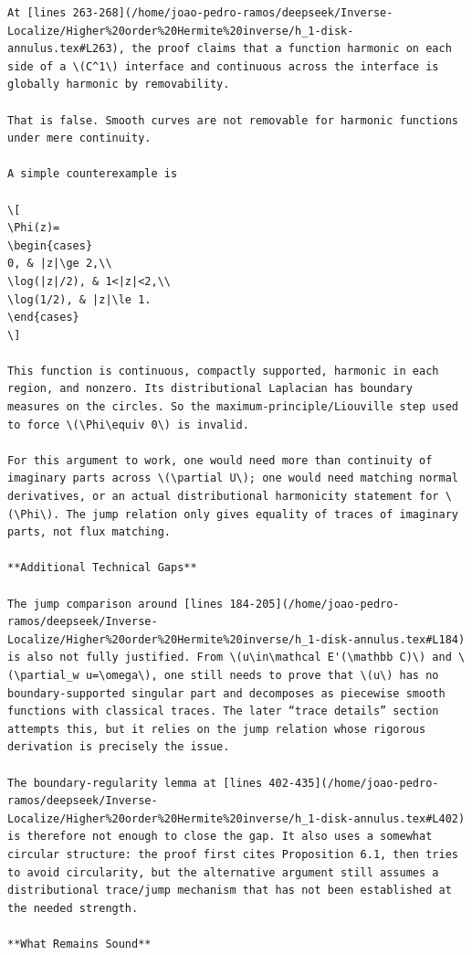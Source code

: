 \documentclass[11pt]{article}
\newcommand{\1}{\mathbf 1}
\begin{document}
\begin{verbatim}
At [lines 263-268](/home/joao-pedro-ramos/deepseek/Inverse-Localize/Higher%20order%20Hermite%20inverse/h_1-disk-annulus.tex#L263), the proof claims that a function harmonic on each side of a \(C^1\) interface and continuous across the interface is globally harmonic by removability.

That is false. Smooth curves are not removable for harmonic functions under mere continuity.

A simple counterexample is

\[
\Phi(z)=
\begin{cases}
0, & |z|\ge 2,\\
\log(|z|/2), & 1<|z|<2,\\
\log(1/2), & |z|\le 1.
\end{cases}
\]

This function is continuous, compactly supported, harmonic in each region, and nonzero. Its distributional Laplacian has boundary measures on the circles. So the maximum-principle/Liouville step used to force \(\Phi\equiv 0\) is invalid.

For this argument to work, one would need more than continuity of imaginary parts across \(\partial U\); one would need matching normal derivatives, or an actual distributional harmonicity statement for \(\Phi\). The jump relation only gives equality of traces of imaginary parts, not flux matching.

**Additional Technical Gaps**

The jump comparison around [lines 184-205](/home/joao-pedro-ramos/deepseek/Inverse-Localize/Higher%20order%20Hermite%20inverse/h_1-disk-annulus.tex#L184) is also not fully justified. From \(u\in\mathcal E'(\mathbb C)\) and \(\partial_w u=\omega\), one still needs to prove that \(u\) has no boundary-supported singular part and decomposes as piecewise smooth functions with classical traces. The later “trace details” section attempts this, but it relies on the jump relation whose rigorous derivation is precisely the issue.

The boundary-regularity lemma at [lines 402-435](/home/joao-pedro-ramos/deepseek/Inverse-Localize/Higher%20order%20Hermite%20inverse/h_1-disk-annulus.tex#L402) is therefore not enough to close the gap. It also uses a somewhat circular structure: the proof first cites Proposition 6.1, then tries to avoid circularity, but the alternative argument still assumes a distributional trace/jump mechanism that has not been established at the needed strength.

**What Remains Sound**


\end{verbatim}
\end{document}
